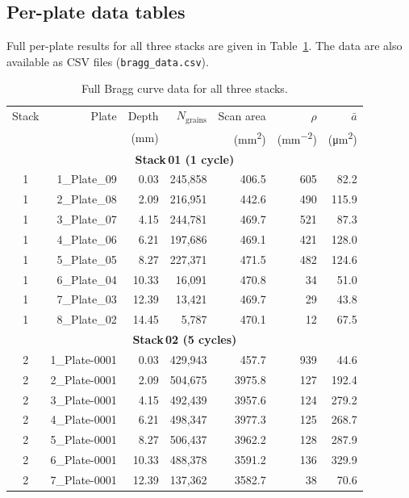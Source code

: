 \documentclass[12pt,a4paper]{article}
\begin{document}
\subsection{Per-plate data tables}

Full per-plate results for all three stacks are given in
Table~\ref{tab:bragg_full}. The data are also available as CSV files
(\texttt{bragg\_data.csv}).

\begin{table}[H]
\centering
\caption{Full Bragg curve data for all three stacks.}
\label{tab:bragg_full}
\begin{tabular}{crrrrrr}
\toprule
Stack & Plate & Depth & $N_{\text{grains}}$ & Scan area &
$\rho$ & $\bar{a}$ \\
 & & (mm) & & (\si{\mm\squared}) &
(\si{\mm^{-2}}) & (\si{\micro\meter\squared}) \\
\midrule
\multicolumn{7}{c}{\textbf{Stack\,01 (1 cycle)}} \\
\rule{0pt}{2ex}
1 & 1\_Plate\_09 & 0.03 & 245,858 & 406.5 & 605 & 82.2 \\
1 & 2\_Plate\_08 & 2.09 & 216,951 & 442.6 & 490 & 115.9 \\
1 & 3\_Plate\_07 & 4.15 & 244,781 & 469.7 & 521 & 87.3 \\
1 & 4\_Plate\_06 & 6.21 & 197,686 & 469.1 & 421 & 128.0 \\
1 & 5\_Plate\_05 & 8.27 & 227,371 & 471.5 & 482 & 124.6 \\
1 & 6\_Plate\_04 & 10.33 & 16,091 & 470.8 & 34 & 51.0 \\
1 & 7\_Plate\_03 & 12.39 & 13,421 & 469.7 & 29 & 43.8 \\
1 & 8\_Plate\_02 & 14.45 & 5,787 & 470.1 & 12 & 67.5 \\
\midrule
\multicolumn{7}{c}{\textbf{Stack\,02 (5 cycles)}} \\
\rule{0pt}{2ex}
2 & 1\_Plate-0001 & 0.03 & 429,943 & 457.7 & 939 & 44.6 \\
2 & 2\_Plate-0001 & 2.09 & 504,675 & 3975.8 & 127 & 192.4 \\
2 & 3\_Plate-0001 & 4.15 & 492,439 & 3957.6 & 124 & 279.2 \\
2 & 4\_Plate-0001 & 6.21 & 498,347 & 3977.3 & 125 & 268.7 \\
2 & 5\_Plate-0001 & 8.27 & 506,437 & 3962.2 & 128 & 287.9 \\
2 & 6\_Plate-0001 & 10.33 & 488,378 & 3591.2 & 136 & 329.9 \\
2 & 7\_Plate-0001 & 12.39 & 137,362 & 3582.7 & 38 & 70.6 \\

\end{tabular}
\end{table}
\end{document}
